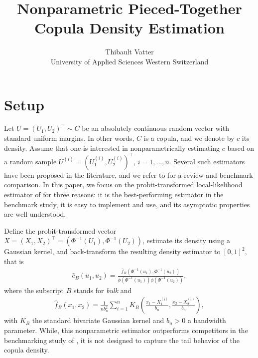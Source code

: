\documentclass[12pt, headinclude=true]{scrartcl}
\title{Nonparametric Pieced-Together Copula Density Estimation}
\author{Thibault Vatter\\ University of Applied Sciences Western Switzerland}
\begin{document}
\maketitle

\section{Setup}

Let $U=(U_1,U_2)^\top \sim C$ be an absolutely continuous random vector with standard uniform margins. In other words, $C$ is a copula, and we denote by $c$ its density.
Assume that one is interested in nonparametrically estimating $c$ based on a random sample $U^{(i)}=(U_{1}^{(i)},U_{2}^{(i)})^\top$, $i=1,\ldots,n$.
Several such estimators have been proposed in the literature, and we refer to \citet{nagler2017nonparametric} for a review and benchmark comparison.
In this paper, we focus on the probit-transformed local-likelihood estimator of \citet{geenens2017probit} for three reasons: it is the best-performing estimator in the benchmark study, it is easy to implement and use, and its asymptotic properties are well understood.

Define the probit-transformed vector $X=(X_1,X_2)^\top=(\Phi^{-1}(U_1),\Phi^{-1}(U_2))$, estimate its density using a Gaussian kernel, and back-transform the resulting density estimator to $[0,1]^2$, that is
\begin{align} \label{eq:bulk_estimator}
  \hat c_{B}(u_1,u_2)
  =
  \frac{
    \hat f_B(\Phi^{-1}(u_1),\Phi^{-1}(u_2))
  }{
    \phi(\Phi^{-1}(u_1))\phi(\Phi^{-1}(u_2))
  },
\end{align}
where the subscript $B$ stands for \emph{bulk} and
\begin{align*}
  \hat f_B(x_1,x_2)
  =
  \frac{1}{n b_n^2}
  \sum_{i=1}^n
  K_B\left(
    \frac{x_1-X_{1}^{(i)}}{b_n},
    \frac{x_2-X_{2}^{(i)}}{b_n}
  \right),
\end{align*}
with $K_B$ the standard bivariate Gaussian kernel and $b_n>0$ a bandwidth parameter.
While, this nonparametric estimator outperforms competitors in the benchmarking study of \citet{nagler2017nonparametric}, it is not designed to capture the tail behavior of the copula density.
\end{document}
